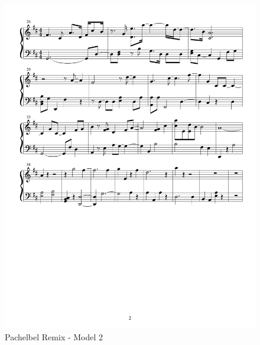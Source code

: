 \documentclass{article} %
\begin{document}
\begin{figure}[H]
\centering
\caption{Pachelbel Remix - Model 2}
\includegraphics [scale = 0.6] {PachelbelRemix2-cropped.pdf}
\end{figure}
\end{document}
